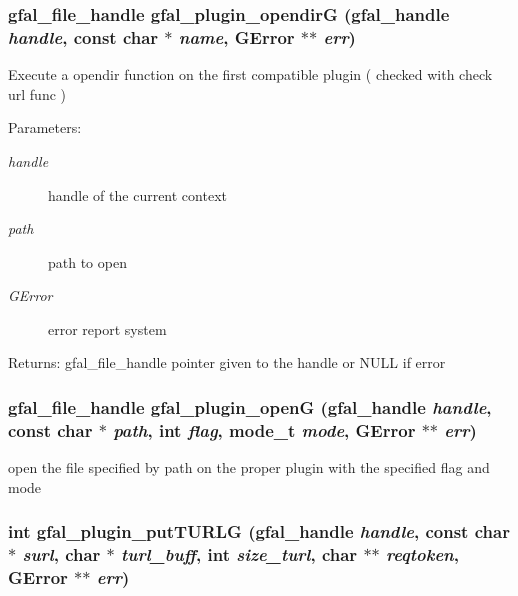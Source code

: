 \subsubsection{\setlength{\rightskip}{0pt plus 5cm}gfal\_\-file\_\-handle gfal\_\-plugin\_\-opendir\-G (gfal\_\-handle {\em handle}, const char $\ast$ {\em name}, GError $\ast$$\ast$ {\em err})}\label{gfal__common__plugin_8c_0f8363d00d0f3418edaef414a84df034}


Execute a opendir function on the first compatible plugin ( checked with check url func ) \begin{Desc}
\item[Parameters:]
\begin{description}
\item[{\em handle}]handle of the current context \item[{\em path}]path to open \item[{\em GError}]error report system \end{description}
\end{Desc}
\begin{Desc}
\item[Returns:]gfal\_\-file\_\-handle pointer given to the handle or NULL if error \end{Desc}
\subsubsection{\setlength{\rightskip}{0pt plus 5cm}gfal\_\-file\_\-handle gfal\_\-plugin\_\-open\-G (gfal\_\-handle {\em handle}, const char $\ast$ {\em path}, int {\em flag}, mode\_\-t {\em mode}, GError $\ast$$\ast$ {\em err})}\label{gfal__common__plugin_8c_322dfbe0ad1e144573719ed08151281e}


open the file specified by path on the proper plugin with the specified flag and mode 
\subsubsection{\setlength{\rightskip}{0pt plus 5cm}int gfal\_\-plugin\_\-put\-TURLG (gfal\_\-handle {\em handle}, const char $\ast$ {\em surl}, char $\ast$ {\em turl\_\-buff}, int {\em size\_\-turl}, char $\ast$$\ast$ {\em reqtoken}, GError $\ast$$\ast$ {\em err})}\label{gfal__common__plugin_8c_f41ab192a34685c9b4027ce029c94731}


